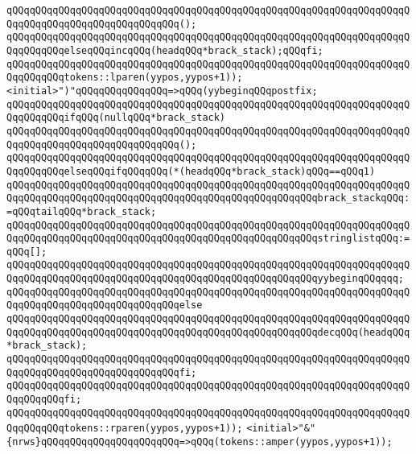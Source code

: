 \verb|qQQqqQQqqQQqqQQqqQQqqQQqqQQqqQQqqQQqqQQqqQQqqQQqqQQqqQQqqQQqqQQqqQQqqQQqqQQqqQQqqQQqqQQqqQQqqQQqqQQq();|\newline
\verb|qQQqqQQqqQQqqQQqqQQqqQQqqQQqqQQqqQQqqQQqqQQqqQQqqQQqqQQqqQQqqQQqqQQqqQQqqQQqqQQqelseqQQqincqQQq(headqQQq*brack_stack);qQQqfi;|\newline
\verb|qQQqqQQqqQQqqQQqqQQqqQQqqQQqqQQqqQQqqQQqqQQqqQQqqQQqqQQqqQQqqQQqqQQqqQQqqQQqqQQqtokens::lparen(yypos,yypos+1));|\newline
\verb|<initial>")"qQQqqQQqqQQqqQQq=>qQQq(yybeginqQQqpostfix;|\newline
\verb|qQQqqQQqqQQqqQQqqQQqqQQqqQQqqQQqqQQqqQQqqQQqqQQqqQQqqQQqqQQqqQQqqQQqqQQqqQQqqQQqifqQQq(nullqQQq*brack_stack)|\newline
\verb|qQQqqQQqqQQqqQQqqQQqqQQqqQQqqQQqqQQqqQQqqQQqqQQqqQQqqQQqqQQqqQQqqQQqqQQqqQQqqQQqqQQqqQQqqQQqqQQqqQQq();|\newline
\verb|qQQqqQQqqQQqqQQqqQQqqQQqqQQqqQQqqQQqqQQqqQQqqQQqqQQqqQQqqQQqqQQqqQQqqQQqqQQqqQQqelseqQQqifqQQqqQQq(*(headqQQq*brack_stack)qQQq==qQQq1)|\newline
\verb|qQQqqQQqqQQqqQQqqQQqqQQqqQQqqQQqqQQqqQQqqQQqqQQqqQQqqQQqqQQqqQQqqQQqqQQqqQQqqQQqqQQqqQQqqQQqqQQqqQQqqQQqqQQqqQQqqQQqqQQqqQQqbrack_stackqQQq:=qQQqtailqQQq*brack_stack;|\newline
\verb|qQQqqQQqqQQqqQQqqQQqqQQqqQQqqQQqqQQqqQQqqQQqqQQqqQQqqQQqqQQqqQQqqQQqqQQqqQQqqQQqqQQqqQQqqQQqqQQqqQQqqQQqqQQqqQQqqQQqqQQqqQQqstringlistqQQq:=qQQq[];|\newline
\verb|qQQqqQQqqQQqqQQqqQQqqQQqqQQqqQQqqQQqqQQqqQQqqQQqqQQqqQQqqQQqqQQqqQQqqQQqqQQqqQQqqQQqqQQqqQQqqQQqqQQqqQQqqQQqqQQqqQQqqQQqqQQqyybeginqQQqqqq;|\newline
\verb|qQQqqQQqqQQqqQQqqQQqqQQqqQQqqQQqqQQqqQQqqQQqqQQqqQQqqQQqqQQqqQQqqQQqqQQqqQQqqQQqqQQqqQQqqQQqqQQqqQQqelse|\newline
\verb|qQQqqQQqqQQqqQQqqQQqqQQqqQQqqQQqqQQqqQQqqQQqqQQqqQQqqQQqqQQqqQQqqQQqqQQqqQQqqQQqqQQqqQQqqQQqqQQqqQQqqQQqqQQqqQQqqQQqqQQqqQQqdecqQQq(headqQQq*brack_stack);|\newline
\verb|qQQqqQQqqQQqqQQqqQQqqQQqqQQqqQQqqQQqqQQqqQQqqQQqqQQqqQQqqQQqqQQqqQQqqQQqqQQqqQQqqQQqqQQqqQQqqQQqqQQqfi;|\newline
\verb|qQQqqQQqqQQqqQQqqQQqqQQqqQQqqQQqqQQqqQQqqQQqqQQqqQQqqQQqqQQqqQQqqQQqqQQqqQQqqQQqfi;|\newline
\verb|qQQqqQQqqQQqqQQqqQQqqQQqqQQqqQQqqQQqqQQqqQQqqQQqqQQqqQQqqQQqqQQqqQQqqQQqqQQqqQQqtokens::rparen(yypos,yypos+1));|\newline
\verb|<initial>"&"{nrws}qQQqqQQqqQQqqQQqqQQqqQQq=>qQQq(tokens::amper(yypos,yypos+1));|\newline
